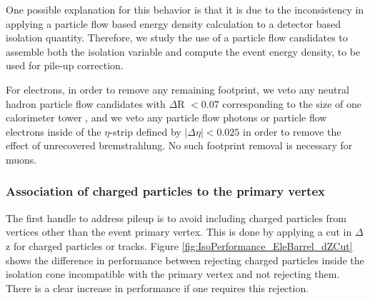 One possible explanation for this behavior is that it is due to the inconsistency in applying
a particle flow based energy density calculation to a detector based isolation quantity. Therefore,
we study the use of a particle flow candidates to assemble both the isolation variable and compute
the event energy density, to be used for pile-up correction.

For electrons, in order to remove any remaining footprint, we veto any neutral hadron particle flow 
candidates with $\Delta$R $ < 0.07$ corresponding to the size of one calorimeter tower , and we 
veto any particle flow photons or particle flow electrons inside of the $\eta$-strip defined by
$|\Delta\eta| < 0.025$ in order to remove the effect of unrecovered bremstrahlung. No such
footprint removal is necessary for muons. 

\subsubsection{Association of charged particles to the primary vertex}

The first handle to address pileup is to avoid including charged particles from vertices other than
the event primary vertex. This is done by applying a cut in $\Delta$z for 
charged particles or tracks. Figure \ref{fig:IsoPerformance_EleBarrel_dZCut} shows the difference
in performance between rejecting charged particles inside the isolation cone 
incompatible with the primary vertex and not rejecting them. There is a clear increase
in performance if one requires this rejection.

